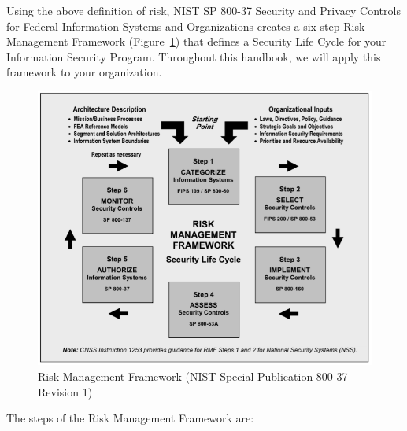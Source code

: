 Using the above definition of risk, NIST SP 800-37 Security and Privacy Controls for Federal Information Systems and Organizations creates a six step Risk Management Framework (Figure~\ref{fig:RiskManagementFramework}) that defines a Security Life Cycle for your Information Security Program. Throughout this handbook, we will apply this framework to your organization.
\begin{figure}[ht]
\centering\includegraphics[scale=.55]{./img/RiskManagementFramework}
\caption{Risk Management Framework (NIST Special Publication 800-37 Revision 1)}\label{fig:RiskManagementFramework}
\end{figure}
The steps of the Risk Management Framework are:
